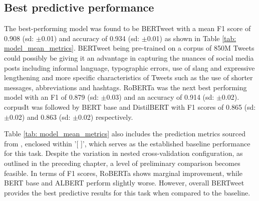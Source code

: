 \subsection{Best predictive performance}
The best-performing model was found to be BERTweet with a mean F1 score of 0.908 (sd: $\pm$0.01) and accuracy of 0.934 (sd: $\pm$0.01) as shown in Table \ref{tab: model_mean_metrics}. BERTweet being pre-trained on a corpus of 850M Tweets could possibly be giving it an advantage in capturing the nuances of social media posts including informal language, typographic errors, use of slang and expressive lengthening and more specific characteristics of Tweets such as the use of shorter messages, abbreviations and hashtags. RoBERTa was the next best performing model with an F1 of 0.879 (sd: $\pm$0.03) and an accuracy of 0.914 (sd: $\pm$0.02). corpusIt was followed by BERT base and DistilBERT with F1 scores of 0.865 (sd: $\pm$0.02) and 0.863 (sd: $\pm$0.02) respectively.

Table \ref{tab: model_mean_metrics} also includes the prediction metrics sourced from \cite{jin_complaint_2020}, enclosed within '[ ]', which serves as the established baseline performance for this task. Despite the variation in nested cross-validation configuration, as outlined in the preceding chapter, a level of preliminary comparison becomes feasible. In terms of F1 scores, RoBERTa shows marginal improvement, while BERT base and ALBERT perform slightly worse. However, overall BERTweet provides the best predictive results for this task when compared to the baseline.\\

